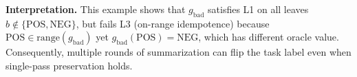\documentclass[11pt]{article}
\theoremstyle{definition}
\theoremstyle{plain}
\newcommand{\fn}[1]{\mathrm{#1}}
\begin{document}
\vspace{1em}
\noindent\textbf{Interpretation.} This example shows that $g_{\text{bad}}$ satisfies L1 on all leaves $b \notin \{\fn{POS}, \fn{NEG}\}$, but fails L3 (on-range idempotence) because $\fn{POS} \in \fn{range}(g_{\text{bad}})$ yet $g_{\text{bad}}(\fn{POS}) = \fn{NEG}$, which has different oracle value. Consequently, multiple rounds of summarization can flip the task label even when single-pass preservation holds.
\end{document}

